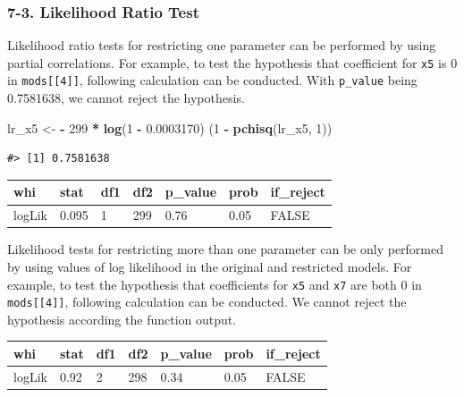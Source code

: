 \documentclass[a4paper]{article}
\newenvironment{Shaded}{\begin{snugshade}}{\end{snugshade}}
\newcommand{\DecValTok}[1]{\textcolor[rgb]{0.00,0.00,0.81}{#1}}
\newcommand{\FloatTok}[1]{\textcolor[rgb]{0.00,0.00,0.81}{#1}}
\newcommand{\KeywordTok}[1]{\textcolor[rgb]{0.13,0.29,0.53}{\textbf{#1}}}
\newcommand{\NormalTok}[1]{#1}
\newcommand{\OperatorTok}[1]{\textcolor[rgb]{0.81,0.36,0.00}{\textbf{#1}}}
\newcommand{\StringTok}[1]{\textcolor[rgb]{0.31,0.60,0.02}{#1}}
\begin{document}
\hypertarget{likelihood-ratio-test}{%
\subsubsection{7-3. Likelihood Ratio Test}\label{likelihood-ratio-test}}

Likelihood ratio tests for restricting one parameter can be performed by
using partial correlations. For example, to test the hypothesis that
coefficient for \texttt{x5} is 0 in \texttt{mods{[}{[}4{]}{]}},
following calculation can be conducted. With \texttt{p\_value} being
0.7581638, we cannot reject the hypothesis.

\begin{Shaded}
\begin{Highlighting}[]
\NormalTok{lr_x5 <-}\StringTok{ }\OperatorTok{-}\StringTok{ }\DecValTok{299} \OperatorTok{*}\StringTok{ }\KeywordTok{log}\NormalTok{(}\DecValTok{1} \OperatorTok{-}\StringTok{ }\FloatTok{0.0003170}\NormalTok{) }
\NormalTok{(}\DecValTok{1} \OperatorTok{-}\StringTok{ }\KeywordTok{pchisq}\NormalTok{(lr_x5, }\DecValTok{1}\NormalTok{))}
\end{Highlighting}
\end{Shaded}

\begin{verbatim}
#> [1] 0.7581638
\end{verbatim}

\begin{table}[H]
\centering
\begin{tabular}{lllllll}
\toprule
whi & stat & df1 & df2 & p\_value & prob & if\_reject\\
\midrule
logLik & 0.095 & 1 & 299 & 0.76 & 0.05 & FALSE\\
\bottomrule
\end{tabular}
\end{table}

Likelihood tests for restricting more than one parameter can be only
performed by using values of log likelihood in the original and
restricted models. For example, to test the hypothesis that coefficients
for \texttt{x5} and \texttt{x7} are both 0 in
\texttt{mods{[}{[}4{]}{]}}, following calculation can be conducted. We
cannot reject the hypothesis according the function output.

\begin{table}[H]
\centering
\begin{tabular}{lllllll}
\toprule
whi & stat & df1 & df2 & p\_value & prob & if\_reject\\
\midrule
logLik & 0.92 & 2 & 298 & 0.34 & 0.05 & FALSE\\
\bottomrule
\end{tabular}
\end{table}
\end{document}
